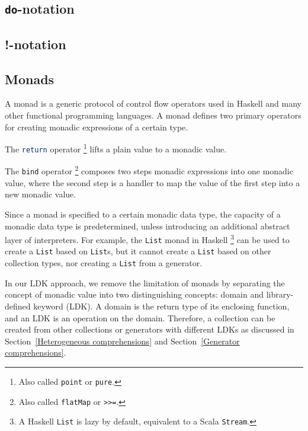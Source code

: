 \subsection{\lstinline{do}-notation}\label{do-notation}


\subsection{!-notation}

\subsection{Monads}\label{Monads}

A monad is a generic protocol of control flow operators used in Haskell and many other functional programming languages. A monad defines two primary operators for creating monadic expressions of a certain type.
\begin{enumerate*}
  \item The \lstinline[language=Haskell,deletekeywords={return}]{return} operator \footnote{Also called \lstinline{point} or \lstinline{pure}.} lifts a plain value to a monadic value.
  \item The \lstinline{bind} operator \footnote{Also called \lstinline{flatMap} or \lstinline{>>=}.} composes two steps monadic expressions into one monadic value, where the second step is a handler to map the value of the first step into a new monadic value.
\end{enumerate*}

Since a monad is specified to a certain monadic data type, the capacity of a monadic data type is predetermined, unless introducing an additional abstract layer of interpreters. For example, the \lstinline{List} monad in Haskell \footnote{A Haskell \lstinline{List} is lazy by default, equivalent to a Scala \lstinline{Stream}.} can be used to create a \lstinline{List} based on \lstinline{List}s, but it cannot create a \lstinline{List} based on other collection types, nor creating a \lstinline{List} from a generator.

In our LDK approach, we remove the limitation of monads by separating the concept of monadic value into two distinguishing concepts: domain and library-defined keyword (LDK). A domain is the return type of its enclosing function, and an LDK is an operation on the domain. Therefore, a collection can be created from other collections or generators with different LDKs as discussed in Section~\ref{Heterogeneous comprehensions} and Section~\ref{Generator comprehensions}. 

